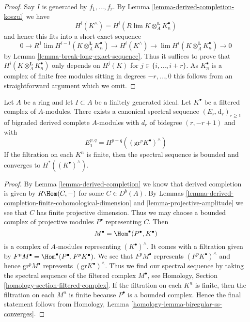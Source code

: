 \begin{proof}
Say $I$ is generated by $f_1, \ldots, f_r$. By
Lemma \ref{lemma-derived-completion-koszul} we have
$$
H^i(K^\wedge) = H^i(R\lim K \otimes_A^\mathbf{L} K_n^\bullet)
$$
and hence this fits into a short exact sequence
$$
0 \to R^1\lim H^{i - 1}(K \otimes_A^\mathbf{L} K_n^\bullet)
\to H^i(K^\wedge) \to \lim H^i(K \otimes_A^\mathbf{L} K_n^\bullet) \to 0
$$
by Lemma \ref{lemma-break-long-exact-sequence}. Thus it suffices to prove
that $H^i(K \otimes_A^\mathbf{L} K_n^\bullet)$ only depends on
$H^j(K)$ for $j \in \{i, \ldots, i + r\}$. As $K_n^\bullet$ is a
complex of finite free modules sitting in degrees $-r, \ldots, 0$
this follows from an straightforward argument which we omit.
\end{proof}

\begin{lemma}
\label{lemma-derived-completion-spectral-sequence}
Let $A$ be a ring and let $I \subset A$ be a finitely generated ideal.
Let $K^\bullet$ be a filtered complex of $A$-modules. There exists a
canonical spectral sequence $(E_r, \text{d}_r)_{r \geq 1}$
of bigraded derived complete $A$-modules with $d_r$ of bidegree
$(r, -r + 1)$ and with
$$
E_1^{p, q} = H^{p + q}((\text{gr}^pK^\bullet)^\wedge)
$$
If the filtration on each $K^n$ is finite, then the spectral sequence is
bounded and converges to $H^*((K^\bullet)^\wedge)$.
\end{lemma}

\begin{proof}
By Lemma \ref{lemma-derived-completion} we know that derived completion is
given by $R\Hom(C, -)$ for some $C \in D^b(A)$. By
Lemmas \ref{lemma-derived-completion-finite-cohomological-dimension} and
\ref{lemma-projective-amplitude} we see that $C$ has finite projective
dimension. Thus we may choose a bounded complex of projective
modules $P^\bullet$ representing $C$. Then
$$
M^\bullet = \Hom^\bullet(P^\bullet, K^\bullet)
$$
is a complex of $A$-modules representing $(K^\bullet)^\wedge$.
It comes with a filtration given by
$F^pM^\bullet = \Hom^\bullet(P^\bullet, F^pK^\bullet)$.
We see that $F^pM^\bullet$ represents $(F^pK^\bullet)^\wedge$
and hence $\text{gr}^pM^\bullet$ represents $(\text{gr}K^\bullet)^\wedge$.
Thus we find our spectral sequence by taking the spectral sequence of
the filtered complex $M^\bullet$, see
Homology, Section \ref{homology-section-filtered-complex}.
If the filtration on each $K^n$ is finite, then the filtration
on each $M^n$ is finite because $P^\bullet$ is a bounded complex.
Hence the final statement follows from
Homology, Lemma \ref{homology-lemma-biregular-ss-converges}.
\end{proof}

